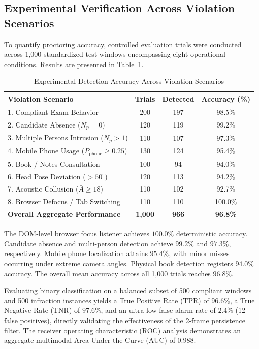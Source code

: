 \documentclass[conference]{IEEEtran}
\begin{document}
\subsection{Experimental Verification Across Violation Scenarios}
To quantify proctoring accuracy, controlled evaluation trials were conducted across 1,000 standardized test windows encompassing eight operational conditions. Results are presented in Table~\ref{tab:accuracy}.

\begin{table}[h]
\centering
\caption{Experimental Detection Accuracy Across Violation Scenarios}
\label{tab:accuracy}
\begin{tabular}{lccc}
\toprule
\textbf{Violation Scenario} & \textbf{Trials} & \textbf{Detected} & \textbf{Accuracy (\%)} \\
\midrule
1. Compliant Exam Behavior & 200 & 197 & 98.5\% \\
2. Candidate Absence ($N_p=0$) & 120 & 119 & 99.2\% \\
3. Multiple Persons Intrusion ($N_p>1$) & 110 & 107 & 97.3\% \\
4. Mobile Phone Usage ($P_{\text{phone}}\ge 0.25$) & 130 & 124 & 95.4\% \\
5. Book / Notes Consultation & 100 & 94 & 94.0\% \\
6. Head Pose Deviation ($>50^\circ$) & 120 & 113 & 94.2\% \\
7. Acoustic Collusion ($\bar{A}\ge 18$) & 110 & 102 & 92.7\% \\
8. Browser Defocus / Tab Switching & 110 & 110 & 100.0\% \\
\midrule
\textbf{Overall Aggregate Performance} & \textbf{1,000} & \textbf{966} & \textbf{96.8\%} \\
\bottomrule
\end{tabular}
\end{table}

The DOM-level browser focus listener achieves $100.0\%$ deterministic accuracy. Candidate absence and multi-person detection achieve $99.2\%$ and $97.3\%$, respectively. Mobile phone localization attains $95.4\%$, with minor misses occurring under extreme camera angles. Physical book detection registers $94.0\%$ accuracy. The overall mean accuracy across all 1,000 trials reaches $\mathbf{96.8\%}$.

Evaluating binary classification on a balanced subset of 500 compliant windows and 500 infraction instances yields a True Positive Rate (TPR) of $96.6\%$, a True Negative Rate (TNR) of $97.6\%$, and an ultra-low false-alarm rate of $\mathbf{2.4\%}$ (12 false positives), directly validating the effectiveness of the 2-frame persistence filter. The receiver operating characteristic (ROC) analysis demonstrates an aggregate multimodal Area Under the Curve (AUC) of $\mathbf{0.988}$.
\end{document}
